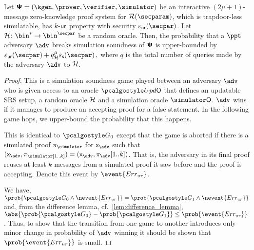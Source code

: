 \begin{theorem}
	\label{thm:simsnd}
	Let $\ps = (\kgen, \prover, \verifier, \simulator)$ be an interactive $(2 \mu + 1)$-message
	zero-knowledge proof system for $\RELGEN(\secparam)$, which is trapdoor-less simulatable, has
	${k\text{-}\mathsf{ur}}$ property with security $\epsur(\secpar)$. Let $\ro\colon \bin^{*} \to \bin^{\secpar}$ be a random oracle. Then, the
	probability that a $\ppt$ adversary $\adv$ breaks simulation soundness of
	$\bm{\mathsf{\Psi}}$ is upper-bounded by
	\(
	\epsur(\secpar) + q_\ro^\mu  \epss(\secpar)\,,
	\)
	where $q$ is the total number of queries made by the adversary $\adv$ to $\mathcal{H}$.
\end{theorem}

\begin{proof}
	 This is a simulation soundness game played between an adversary
	$\advse$ who is given access to an oracle $\initU$ that defines an updatable SRS setup, a random oracle $\mathcal{H}$ and a simulation oracle
	$\simO$. $\adv$ wins if it manages to produce an accepting proof
	for a false statement. In the following game hops, we upper-bound the
	probability that this happens.
	
	 This is identical to $\game{0}$ except that the game is aborted if
	there is a simulated proof $\zkproof_\simulator$ for $\inp_{\adv}$ such that
	$(\inp_{\adv}, \zkproof_\simulator[1..k]) = (\inp_{\adv},
	\zkproof_{\adv}[1..k])$. That is, the adversary in its final proof reuses at
	least $k$ messages from a simulated proof it saw before and the proof is
	accepting.  Denote this event by $\event{\errur}$.
	
	 We have, \( \prob{\game{0} \land
		\nevent{\errur}} = \prob{\game{1} \land \nevent{\errur}} \) and, from the
	difference lemma, cf.~\cref{lem:difference_lemma},
	$ \abs{\prob{\game{0}} - \prob{\game{1}}} \leq \prob{\event{\errur}}\,$.
	Thus, to show that the transition from one game to another introduces only
	minor change in probability of $\adv$ winning it should be shown that
	$\prob{\event{\errur}}$ is small.
	

\end{proof}
